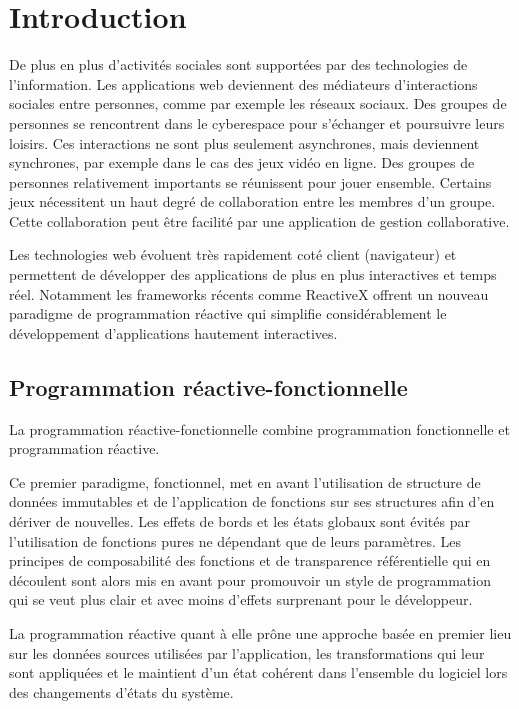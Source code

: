 \chapter{Introduction}

De plus en plus d'activités sociales sont supportées par des technologies de l'information. Les applications web deviennent des médiateurs d'interactions sociales entre personnes, comme par exemple les réseaux sociaux. Des groupes de personnes se rencontrent dans le cyberespace pour s'échanger et poursuivre leurs loisirs. Ces interactions ne sont plus seulement asynchrones, mais deviennent synchrones, par exemple dans le cas des jeux vidéo en ligne. Des groupes de personnes relativement importants se réunissent pour jouer ensemble. Certains jeux nécessitent un haut degré de collaboration entre les membres d'un groupe. Cette collaboration peut être facilité par une application de gestion collaborative.

Les technologies web évoluent très rapidement coté client (navigateur) et permettent de développer des applications de plus en plus interactives et temps réel. Notamment les frameworks récents comme ReactiveX offrent un nouveau paradigme de programmation réactive qui simplifie considérablement le développement d'applications hautement interactives.

\section{Programmation réactive-fonctionnelle}

La programmation réactive-fonctionnelle combine programmation fonctionnelle et programmation réactive.

Ce premier paradigme, fonctionnel, met en avant l'utilisation de structure de données immutables et de l'application de fonctions sur ses structures afin d'en dériver de nouvelles. Les effets de bords et les états globaux sont évités par l'utilisation de fonctions pures ne dépendant que de leurs paramètres. Les principes de composabilité des fonctions et de transparence référentielle qui en découlent sont alors mis en avant pour promouvoir un style de programmation qui se veut plus clair et avec moins d'effets surprenant pour le développeur.

La programmation réactive quant à elle prône une approche basée en premier lieu sur les données sources utilisées par l'application, les transformations qui leur sont appliquées et le maintient d'un état cohérent dans l'ensemble du logiciel lors des changements d'états du système.

